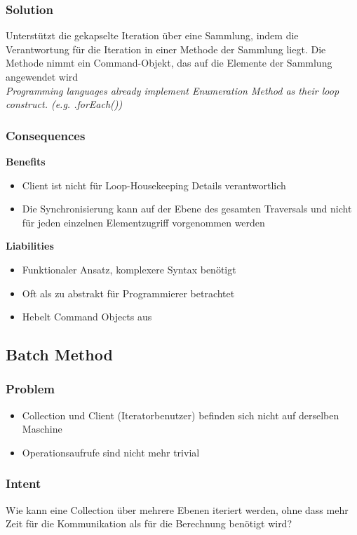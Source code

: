 \subsubsection{Solution}
Unterstützt die gekapselte Iteration über eine Sammlung, indem die Verantwortung für die Iteration in einer Methode der Sammlung liegt. Die Methode nimmt ein Command-Objekt, das auf die Elemente der Sammlung angewendet wird \\

\textit{Programming languages already implement Enumeration Method as their loop construct. (e.g. .forEach())}\\

\subsubsection{Consequences}
\textbf{Benefits}
\begin{itemize}
    \item Client ist nicht für Loop-Housekeeping Details verantwortlich
    \item Die Synchronisierung kann auf der Ebene des gesamten Traversals und nicht für jeden einzelnen Elementzugriff vorgenommen werden
\end{itemize}
\vspace{10pt}
\textbf{Liabilities}
\begin{itemize}
    \item Funktionaler Ansatz, komplexere Syntax benötigt
    \item Oft als zu abstrakt für Programmierer betrachtet
    \item Hebelt Command Objects aus
\end{itemize}

\subsection{Batch Method}
\subsubsection{Problem}
\begin{itemize}
    \item Collection und Client (Iteratorbenutzer) befinden sich nicht auf derselben Maschine
    \item Operationsaufrufe sind nicht mehr trivial
\end{itemize}

\subsubsection{Intent}
Wie kann eine Collection über mehrere Ebenen iteriert werden, ohne dass mehr Zeit für die Kommunikation als für die Berechnung benötigt wird?

